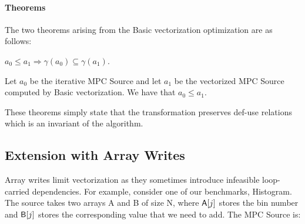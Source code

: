 \paragraph{Theorems} The two theorems arising from the Basic vectorization optimization are as follows: 

\begin{theorem} $a_0 \le a_1 \Rightarrow \gamma(a_0) \subseteq \gamma(a_1)$.
\end{theorem}

\begin{theorem} Let $a_0$ be the iterative MPC Source and let $a_1$ be the vectorized MPC Source computed by Basic vectorization. 
We have that $a_0 \le a_1$. 
\end{theorem}

These theorems simply state that the transformation preserves def-use relations which is an invariant of the algorithm.


\subsection{Extension with Array Writes}
\label{sec:array_writes}


Array writes limit vectorization as they sometimes introduce infeasible loop-carried dependencies. For example, consider 
one of our benchmarks, Histogram. The source takes two arrays {\sf A} and {\sf B} of size {\sf N}, where ${\sf A}[j]$ stores the bin number and
${\sf B}[j]$ stores the corresponding value that we need to add. The MPC Source is:

